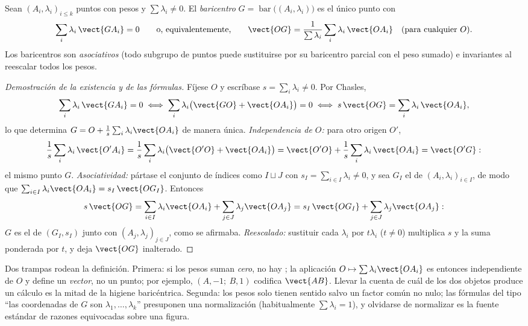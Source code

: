 \begin{definition}[Baricentro]\label{def:b2:affine:barycenter}
Sean $(A_i, \lambda_i)_{i \leq k}$ puntos con pesos y
$\sum\lambda_i \neq 0$. El \emph{baricentro} $G =
\operatorname{bar}\bigl((A_i, \lambda_i)\bigr)$ es el único punto
con
\[
\sum_i \lambda_i\, \vect{GA_i} = 0
\qquad\text{o, equivalentemente,}\qquad
\vect{OG} = \frac{1}{\sum\lambda_i}\sum_i \lambda_i\,\vect{OA_i}
\quad (\text{para cualquier } O).
\]
Los baricentros son \emph{asociativos} (todo subgrupo de puntos
puede sustituirse por su baricentro parcial con el peso sumado) e
invariantes al reescalar todos los pesos.
\end{definition}

\begin{proof}[Demostración de la existencia y de las fórmulas]
Fíjese $O$ y escríbase $s = \sum_i\lambda_i \neq 0$. Por Chasles,
\[
\sum_i\lambda_i\,\vect{GA_i} = 0
\iff \sum_i\lambda_i\bigl(\vect{GO} + \vect{OA_i}\bigr) = 0
\iff s\,\vect{OG} = \sum_i\lambda_i\,\vect{OA_i},
\]
lo que determina $G = O + \frac1s\sum_i\lambda_i\vect{OA_i}$ de
manera única. \emph{Independencia de $O$:} para otro origen $O'$,
\[
\frac1s\sum_i\lambda_i\,\vect{O'A_i}
= \frac1s\sum_i\lambda_i\bigl(\vect{O'O} + \vect{OA_i}\bigr)
= \vect{O'O} + \frac1s\sum_i\lambda_i\,\vect{OA_i}
= \vect{O'G} :
\]
el mismo punto $G$. \emph{Asociatividad:} pártase el conjunto de
índices como $I \sqcup J$ con $s_I = \sum_{i\in I}\lambda_i \neq 0$,
y sea $G_I$ el  de $(A_i, \lambda_i)_{i\in I}$, de modo
que $\sum_{i\in I}\lambda_i\vect{OA_i} = s_I\,\vect{OG_I}$.
Entonces
\[
s\,\vect{OG}
= \sum_{i\in I}\lambda_i\vect{OA_i} +
\sum_{j\in J}\lambda_j\vect{OA_j}
= s_I\,\vect{OG_I} + \sum_{j\in J}\lambda_j\vect{OA_j} :
\]
$G$ es el  de $(G_I, s_I)$ junto con $(A_j,
\lambda_j)_{j\in J}$, como se afirmaba. \emph{Reescalado:}
sustituir cada $\lambda_i$ por $t\lambda_i$ ($t \neq 0$) multiplica
$s$ y la suma ponderada por $t$, y deja $\vect{OG}$ inalterado.
\end{proof}

\begin{remark}
Dos trampas rodean la definición. Primera: si los pesos suman
\emph{cero}, no hay ; la aplicación $O \mapsto
\sum\lambda_i\vect{OA_i}$ es entonces independiente de $O$ y define
un \emph{vector}, no un punto; por ejemplo, $(A, -1;\ B, 1)$
codifica $\vect{AB}$. Llevar la cuenta de cuál de los dos objetos
produce un cálculo es la mitad de la higiene baricéntrica. Segunda:
los pesos solo tienen sentido salvo un factor común no nulo; las
fórmulas del tipo ``las coordenadas de $G$ son $\lambda_1, \dots,
\lambda_k$'' presuponen una normalización (habitualmente
$\sum\lambda_i = 1$), y olvidarse de normalizar es la fuente
estándar de razones equivocadas sobre una figura.
\end{remark}

